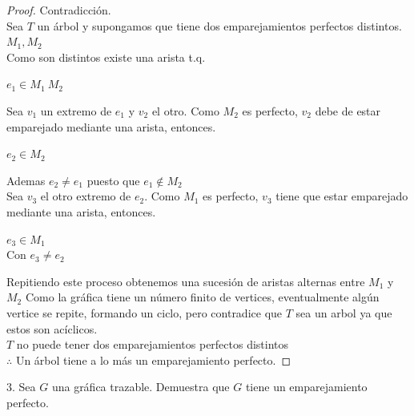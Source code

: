 \documentclass{article}
\begin{document}
	\begin{proof} Contradicción. \\
	Sea $T$ un árbol y supongamos que tiene dos emparejamientos perfectos distintos. $M_1 , M_2$\\
	Como son distintos existe una arista t.q. \\
	\begin{center}
	$e_1 \in M_1 \ M_2 $
	\end{center}
	Sea $v_1$ un extremo de $e_1$ y $v_2$ el otro. Como $M_2$ es perfecto, $v_2$ debe de estar emparejado mediante una arista, entonces. 
	\begin{center}
	$e_2 \in M_2$
	\end{center}
	Ademas $e_2 \neq e_1$ puesto que $e_1 \notin M_2$ \\
	Sea $v_3$ el otro extremo de $e_2$. Como $M_1$ es perfecto, $v_3$ tiene que estar emparejado mediante una arista, entonces. \\
	\begin{center}
	$e_3 \in M_1$ \\
	Con $e_3 \neq e_2$
	\end{center} 

	Repitiendo este proceso obtenemos una sucesión de aristas alternas entre $M_1$ y $M_2$ 
	\newline
	Como la gráfica tiene un número finito de vertices, eventualmente algún vertice se repite, formando un ciclo, pero contradice que $T$ sea un
	arbol ya que estos son acíclicos. \\
	$T$ no puede tener dos emparejamientos perfectos distintos\\
	$\therefore$  Un árbol tiene a lo más un emparejamiento perfecto. 
	
	\end{proof}
	\begin{justify}
	3. Sea $G$ una gráfica trazable. Demuestra que $G$ tiene un emparejamiento perfecto.
	\end{justify}
\end{document}
